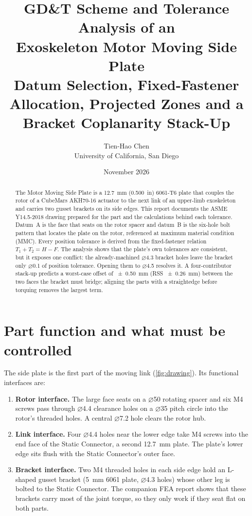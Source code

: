 \documentclass[11pt,letterpaper]{article}
\title{\textbf{GD\&T Scheme and Tolerance Analysis of an\\Exoskeleton Motor Moving Side Plate}\\[4pt]
\large Datum Selection, Fixed-Fastener Allocation, Projected Zones and a Bracket Coplanarity Stack-Up}
\author{Tien-Hao Chen\\University of California, San Diego}
\date{November 2026}
\newcommand{\dia}{$\varnothing$}
\begin{document}
\maketitle

\begin{abstract}
\noindent
The Motor Moving Side Plate is a \SI{12.7}{mm} (\SI{0.500}{in}) 6061-T6 plate that couples the
rotor of a CubeMars AKH70-16 actuator to the next link of an upper-limb exoskeleton and carries
two gusset brackets on its side edges. This report documents the ASME Y14.5-2018 drawing
prepared for the part and the calculations behind each tolerance. Datum~A is the face that seats
on the rotor spacer and datum~B is the six-hole bolt pattern that locates the plate on the rotor,
referenced at maximum material condition (MMC). Every position tolerance is derived from the
fixed-fastener relation $T_1+T_2=H-F$. The analysis shows that the plate's own tolerances are
consistent, but it exposes one conflict: the already-machined \dia4.3 bracket holes leave the
bracket only \dia0.1 of position tolerance. Opening them to \dia4.5 resolves it. A
four-contributor stack-up predicts a worst-case offset of \SI{\pm0.50}{mm} (RSS
\SI{\pm0.26}{mm}) between the two faces the bracket must bridge; aligning the parts with a
straightedge before torquing removes the largest term.
\end{abstract}

\section{Part function and what must be controlled}
\label{sec:function}

The side plate is the first part of the moving link (\cref{fig:drawing}). Its functional
interfaces are:

\begin{enumerate}[label=(\arabic*)]
  \item \textbf{Rotor interface.} The large face seats on a \dia50 rotating spacer and six M4
        screws pass through \dia4.4 clearance holes on a \dia35 pitch circle into the rotor's
        threaded holes. A central \dia7.2 hole clears the rotor hub.
  \item \textbf{Link interface.} Four \dia4.4 holes near the lower edge take M4 screws into the
        end face of the Static Connector, a second \SI{12.7}{mm} plate. The plate's lower edge
        sits flush with the Static Connector's outer face.
  \item \textbf{Bracket interface.} Two M4 threaded holes in each side edge hold an L-shaped
        gusset bracket (\SI{5}{mm} 6061 plate, \dia4.3 holes) whose other leg is bolted to the
        Static Connector. The companion FEA report shows that these brackets carry most of the
        joint torque, so they only work if they seat flat on both parts.
\end{enumerate}
\end{document}
